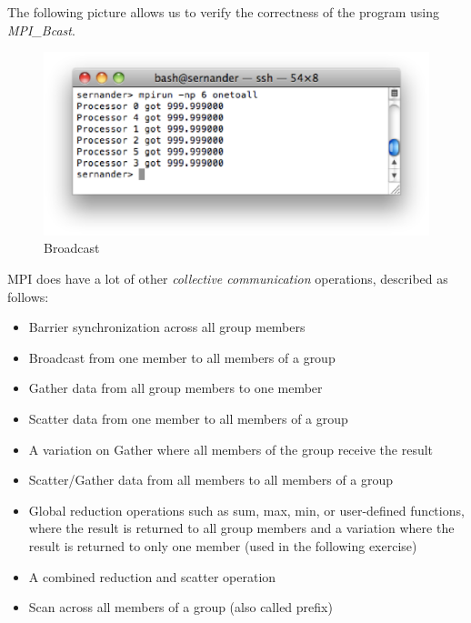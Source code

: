 The following picture allows us to verify the correctness of the program using \textit{MPI\_Bcast}.
\begin{figure}[!h]
\begin{center}
	\includegraphics[width=\textwidth]{pic/bcast.eps}
	\caption{Broadcast}
\end{center}
\end{figure}

MPI does have a lot of other \textit{collective communication} operations, described as follows:

\begin{itemize}
	\item Barrier synchronization across all group members
	\item Broadcast from one member to all members of a group
	\item Gather data from all group members to one member 
	\item Scatter data from one member to all members of a group
	\item A variation on Gather where all members of the group receive the result
	\item Scatter/Gather data from all members to all members of a group
	\item Global reduction operations such as sum, max, min, or user-defined functions, where the result is returned to all group members and a variation where the result is returned to only one member (used in the following exercise) 
	\item A combined reduction and scatter operation
	\item Scan across all members of a group (also called prefix)
\end{itemize}

